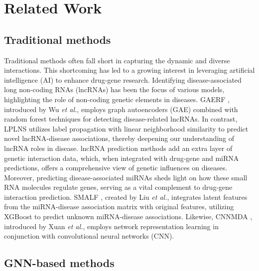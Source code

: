 \section{Related Work}
\label{sec: relatedwork}
\subsection{Traditional methods}

Traditional methods often fall short in capturing the dynamic and diverse interactions. This shortcoming has led to a growing interest in leveraging artificial intelligence (AI) to enhance drug-gene research. Identifying disease-associated long non-coding RNAs (lncRNAs) has been the focus of various models, highlighting the role of non-coding genetic elements in diseases. GAERF \cite{wu2021gaerf}, introduced by Wu \textit{et al.}, employs graph autoencoders (GAE) combined with random forest techniques for detecting disease-related lncRNAs. In contrast, LPLNS \cite{li2018predicting} utilizes label propagation with linear neighborhood similarity to predict novel lncRNA-disease associations, thereby deepening our understanding of lncRNA roles in disease. lncRNA prediction methods add an extra layer of genetic interaction data, which, when integrated with drug-gene and miRNA predictions, offers a comprehensive view of genetic influences on diseases. Moreover, predicting disease-associated miRNAs sheds light on how these small RNA molecules regulate genes, serving as a vital complement to drug-gene interaction prediction. SMALF \cite{liu2021smalf}, created by Liu \textit{et al.}, integrates latent features from the miRNA-disease association matrix with original features, utilizing XGBoost \cite{chen2016xgboost} to predict unknown miRNA-disease associations. Likewise, CNNMDA \cite{xuan2019inferring}, introduced by Xuan \textit{et al.}, employs network representation learning in conjunction with convolutional neural networks (CNN).
 
\subsection{GNN-based methods}

